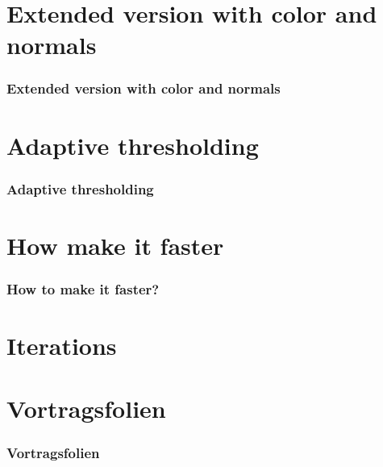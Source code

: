 \documentclass[
	10pt,
	t		%
]{beamer}
\begin{document}
\section{Extended version with color and normals}
\begin{frame}
\frametitle{Extended version with color and normals}
\centering

\end{frame}


\section{Adaptive thresholding}
\begin{frame}
\frametitle{Adaptive thresholding}
\centering

\end{frame}

\section{How make it faster}
\begin{frame}
\frametitle{How to make it faster?}
\centering

\end{frame}

\section{Iterations}
\begin{frame}
\begin{center}
\end{center}
\end{frame}

\section{Vortragsfolien}
\begin{frame}
\frametitle{Vortragsfolien}
\end{frame}
\end{document}
